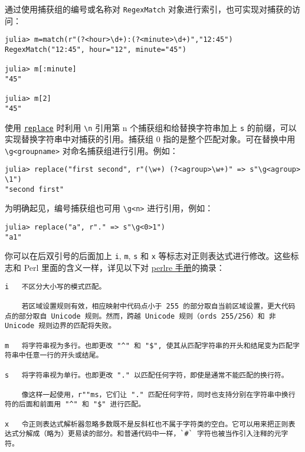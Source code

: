 通过使用捕获组的编号或名称对 \texttt{RegexMatch} 对象进行索引，也可实现对捕获的访问：




\begin{verbatim}
julia> m=match(r"(?<hour>\d+):(?<minute>\d+)","12:45")
RegexMatch("12:45", hour="12", minute="45")

julia> m[:minute]
"45"

julia> m[2]
"45"
\end{verbatim}



使用 \hyperlink{2106088282730686749}{\texttt{replace}} 时利用 \texttt{{\textbackslash}n} 引用第 n 个捕获组和给替换字符串加上 \texttt{s} 的前缀，可以实现替换字符串中对捕获的引用。捕获组 0 指的是整个匹配对象。可在替换中用 \texttt{{\textbackslash}g<groupname>} 对命名捕获组进行引用。例如：




\begin{verbatim}
julia> replace("first second", r"(\w+) (?<agroup>\w+)" => s"\g<agroup> \1")
"second first"
\end{verbatim}



为明确起见，编号捕获组也可用 \texttt{{\textbackslash}g<n>} 进行引用，例如：




\begin{verbatim}
julia> replace("a", r"." => s"\g<0>1")
"a1"
\end{verbatim}



你可以在后双引号的后面加上 \texttt{i}, \texttt{m}, \texttt{s} 和 \texttt{x} 等标志对正则表达式进行修改。这些标志和 Perl 里面的含义一样，详见以下对 \href{http://perldoc.perl.org/perlre.html\#Modifiers}{perlre 手册}的摘录：




\begin{lstlisting}
i   不区分大小写的模式匹配。

    若区域设置规则有效，相应映射中代码点小于 255 的部分取自当前区域设置，更大代码点的部分取自 Unicode 规则。然而，跨越 Unicode 规则（ords 255/256）和 非 Unicode 规则边界的匹配将失败。

m   将字符串视为多行。也即更改 "^" 和 "$", 使其从匹配字符串的开头和结尾变为匹配字符串中任意一行的开头或结尾。

s   将字符串视为单行。也即更改 "." 以匹配任何字符，即使是通常不能匹配的换行符。

    像这样一起使用，r""ms，它们让 "." 匹配任何字符，同时也支持分别在字符串中换行符的后面和前面用 "^" 和 "$" 进行匹配。

x   令正则表达式解析器忽略多数既不是反斜杠也不属于字符类的空白。它可以用来把正则表达式分解成（略为）更易读的部分。和普通代码中一样，`#` 字符也被当作引入注释的元字符。
\end{lstlisting}



